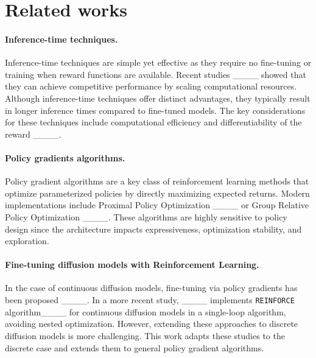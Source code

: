 \section{Related works}
\paragraph{Inference-time techniques.}
Inference-time techniques are simple yet effective as they require no fine-tuning or training when reward functions are available. Recent studies ____ showed that they can achieve competitive performance by scaling computational resources. Although inference-time techniques offer distinct advantages, they typically result in longer inference times compared to fine-tuned models. The key considerations for these techniques include computational efficiency and differentiability of the reward ____.

\paragraph{Policy gradients algorithms.}
Policy gradient algorithms are a key class of reinforcement learning methods that optimize parameterized policies by directly maximizing expected returns. Modern implementations include Proximal Policy Optimization ____ or Group Relative Policy Optimization ____. These algorithms are highly sensitive to policy design since the architecture impacts expressiveness, optimization stability, and exploration.

\paragraph{Fine-tuning diffusion models with Reinforcement Learning.}
In the case of continuous diffusion models, fine-tuning via policy gradients has been proposed ____. In a more recent study, ____ implements \texttt{REINFORCE} algorithm____ for continuous diffusion models in a single-loop algorithm, avoiding nested optimization. However, extending these approaches to discrete diffusion models is more challenging. This work adapts these studies to the discrete case and extends them to general policy gradient algorithms.
